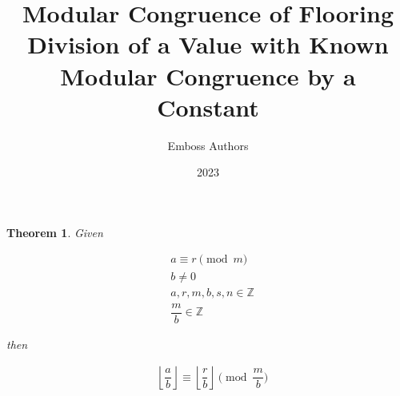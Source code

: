 \documentclass{article}
\title{Modular Congruence of Flooring Division of a Value with Known Modular Congruence by a Constant}
\author{Emboss Authors}
\date{2023}
\begin{document}
\maketitle

\newtheorem{theorem}{Theorem}


\begin{theorem}
Given

\begin{align*}
  &{a} \equiv {r} \pmod{{m}} \\
  &{b} \neq 0 \\
  &{a}, {r}, {m}, {b}, {s}, {n} \in \mathbb{Z} \\
  &\dfrac{{m}}{{b}} \in \mathbb{Z}
\end{align*}

then

\begin{align}
  &\left\lfloor\dfrac{{a}}{{b}}\right\rfloor \equiv \left\lfloor\dfrac{{r}}{{b}}\right\rfloor \pmod{\dfrac{{m}}{{b}}} \label{eq:result}
\end{align}
\end{theorem}
\end{document}
